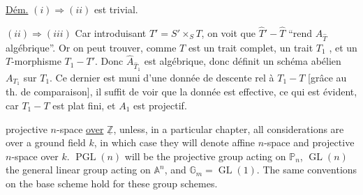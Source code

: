 

\uline{Dém.} $(i)\Longrightarrow(ii)$ est trivial.

$(ii)\Longrightarrow(iii)$ Car introduisant $T'=S'\times_S T$, on voit que $\widehat T'\mathbin{-}\widehat T$ ``rend $\widehat A_{\widehat T}$ algébrique''. Or on peut trouver, comme $T$ est un trait complet, un trait $T_1$  , et un $T$-morphisme $T_1\mathbin{-}T'$. Donc $\widehat A_{\widehat T_1}$ est algébrique, donc définit un schéma abélien $A_{T_1}$ sur $T_1$. Ce dernier est muni d'une donnée de descente rel à $T_1\mathbin{-}T$ [grâce au th. de comparaison], il suffit  de voir que la donnée est effective, ce qui est évident, car $T_1\mathbin{-}T$ est  plat fini, et $A_1$ est projectif.




projective $n$-space \uline{over} $\underline{\mathbb Z}$, unless, in a particular chapter, all considerations are over a ground field $k$, in which case they will denote affine $n$-space and projective $n$-space over $k$. $\operatorname{PGL}(n)$ will be the projective group acting on $\mathbb P_n$, $\operatorname{GL}(n)$ the general linear group acting on $\mathbb A^n$, and $\mathbb G_m=\operatorname{GL}(1)$. The same conventions on the base scheme hold for these group schemes.

